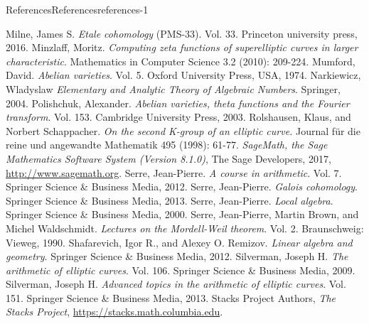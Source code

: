 \documentclass[oneside,10pt,]{book}
\numberwithin{equation}{section}
\begin{document}
\begin{references-chapter-numberless}{References}{}{References}{}{}{references-1}
\begin{thebibliography}{9}
\hypertarget{bib-milne-etale}{}Milne, James S. \textit{Etale cohomology} (PMS-33). Vol. 33. Princeton university press, 2016.
\hypertarget{bib-minzlaff}{}Minzlaff, Moritz. \textit{Computing zeta functions of superelliptic curves in larger characteristic}. Mathematics in Computer Science 3.2 (2010): 209-224.
\hypertarget{bib-mumford-abvar}{}Mumford, David. \textit{Abelian varieties}. Vol. 5. Oxford University Press, USA, 1974.
\hypertarget{bib-narkiewicz}{}Narkiewicz, Wladyslaw  \textit{Elementary and Analytic Theory of Algebraic Numbers}. Springer, 2004.
\hypertarget{bib-polishchuck}{}Polishchuk, Alexander. \textit{Abelian varieties, theta functions and the Fourier transform}. Vol. 153. Cambridge University Press, 2003.
\hypertarget{bib-rolshausen}{}Rolshausen, Klaus, and Norbert Schappacher.  \textit{On the second K-group of an elliptic curve.}  Journal für die reine und angewandte Mathematik 495 (1998): 61-77.
\hypertarget{bib-sage}{}\textit{SageMath, the Sage Mathematics Software System (Version 8.1.0)}, The Sage Developers, 2017, \url{http://www.sagemath.org}.
\hypertarget{bib-serre-course}{}Serre, Jean-Pierre. \textit{A course in arithmetic}. Vol. 7. Springer Science \& Business Media, 2012.
\hypertarget{bib-serre-gal-coh}{}Serre, Jean-Pierre. \textit{Galois cohomology}. Springer Science \& Business Media, 2013.
\hypertarget{bib-serre-local-alg}{}Serre, Jean-Pierre. \textit{Local algebra}. Springer Science \& Business Media, 2000.
\hypertarget{bib-serre-mordell-weil}{}Serre, Jean-Pierre, Martin Brown, and Michel Waldschmidt. \textit{Lectures on the Mordell-Weil theorem}. Vol. 2. Braunschweig: Vieweg, 1990.
\hypertarget{bib-shafarevich-remizov}{}Shafarevich, Igor R., and Alexey O. Remizov. \textit{Linear algebra and geometry}. Springer Science \& Business Media, 2012.
\hypertarget{bib-silverman}{}Silverman, Joseph H. \textit{The arithmetic of elliptic curves}. Vol. 106. Springer Science \& Business Media, 2009.
\hypertarget{bib-silverman-advanced}{}Silverman, Joseph H. \textit{Advanced topics in the arithmetic of elliptic curves}. Vol. 151. Springer Science \& Business Media, 2013.
\hypertarget{bib-stacks}{}Stacks Project Authors, \textit{The Stacks Project}, \url{https://stacks.math.columbia.edu}.

\end{thebibliography}
\end{references-chapter-numberless}
\end{document}
